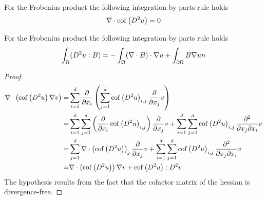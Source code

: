 \begin{lemma}
For the Frobenius product the following integration by parts rule holds
\[
	\nabla \cdot \operatorname{cof} \left( D^2 u \right) = 0
\] 
\end{lemma}


\begin{lemma}
For the Frobenius product the following integration by parts rule holds
\[
	\int_\Omega (D^2 u : B) = - \int_\Omega (\nabla \cdot B) \cdot \nabla u + \int_{\partial \Omega}  B \nabla u \boldmath n
\] 
\end{lemma}

\begin{proof}
\begin{align*}
\nabla \cdot \left( \mycof {D^2 u } \nabla v \right) =&%
\sum_{i= 1}^{d} \dx {x_i} 	\left( \sum_{j= 1}^{d} \mycof {D^2 u }_{i,j} \dx{x_j} v \right)\\
=&  \sum_{i= 1}^{d} \sum_{j= 1}^{d}  \left(\dx {x_i} \mycof {D^2 u }_{i,j}  \right) \dx{x_j}v + \sum_{i= 1}^{d} \sum_{j= 1}^{d}  \mycof {D^2 u }_{i,j} \dxy{x_j}{x_i}v\\
=&  \sum_{j= 1}^{d}  \nabla \cdot \left(\mycof {D^2 u }\right)_j \dx{x_j}v + \sum_{i= 1}^{d} \sum_{j= 1}^{d}  \mycof {D^2 u }_{i,j} \dxy{x_j}{x_i}v\\
=&   \nabla \cdot \left(\mycof {D^2 u }\right) \nabla v+ \mycof {D^2 u }:D^2v
\end{align*}
The hypothesis results from the fact that the cofactor matrix of the hessian is divergence-free.
\end{proof}
